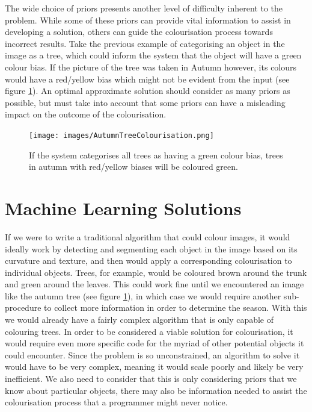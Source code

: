 \documentclass{l4proj}
\begin{document}

The wide choice of priors presents another level of difficulty inherent to the problem. While some of these priors can provide vital information to assist in developing a solution, others can guide the colourisation process towards incorrect results. Take the previous example of categorising an object in the image as a tree, which could inform the system that the object will have a green colour bias. If the picture of the tree was taken in Autumn however, its colours would have a red/yellow bias which might not be evident from the input (see figure \ref{fig:treecolourisation}). An optimal approximate solution should consider as many priors as possible, but must take into account that some priors can have a misleading impact on the outcome of the colourisation.

\begin{figure}[H]
    \centering
    \texttt{[image: images/AutumnTreeColourisation.png]}    

    \caption{If the system categorises all trees as having a green colour bias, trees in autumn with red/yellow biases will be coloured green.}

    \label{fig:treecolourisation} 
\end{figure}

\section{Machine Learning Solutions}
If we were to write a traditional algorithm that could colour images, it would ideally work by detecting and segmenting each object in the image based on its curvature and texture, and then would apply a corresponding colourisation to individual objects. Trees, for example, would be coloured brown around the trunk and green around the leaves. This could work fine until we encountered an image like the autumn tree (see figure \ref{fig:treecolourisation}), in which case we would require another sub-procedure to collect more information in order to determine the season. With this we would already have a fairly complex algorithm that is only capable of colouring trees. In order to be considered a viable solution for colourisation, it would require even more specific code for the myriad of other potential objects it could encounter. Since the problem is so unconstrained, an algorithm to solve it would have to be very complex, meaning it would scale poorly and likely be very inefficient. We also need to consider that this is only considering priors that we know about particular objects, there may also be information needed to assist the colourisation process that a programmer might never notice.
\end{document}
